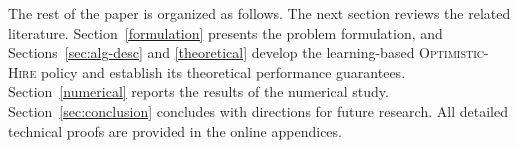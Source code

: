 \documentclass[opre,blindrev]{informs3}
\begin{document}


The rest of the paper is organized as follows. The next section reviews the related literature. Section~\ref{formulation} presents the problem formulation, and Sections~\ref{sec:alg-desc} and \ref{theoretical} develop the learning-based \textsc{Optimistic-Hire} policy and establish its theoretical performance guarantees. Section~\ref{numerical} reports the results of the numerical study. Section~\ref{sec:conclusion} concludes with directions for future research. All detailed technical proofs are provided in the online appendices.
\end{document}
